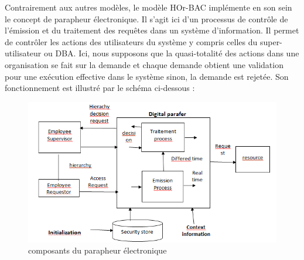 \label{sectionArchitectureBOr-BAC}

Contrairement aux autres modèles, le modèle HOr-BAC implémente en son sein le concept de parapheur électronique. Il s'agit ici d'un processus de contrôle de l'émission et du traitement des requêtes dans un système d'information. Il permet de contrôler les actions des utilisateurs du système y compris celles du  super-utilisateur ou DBA. Ici, nous supposons que la quasi-totalité des actions dans une organisation se fait sur la demande et chaque demande obtient une validation pour une exécution effective dans le système sinon, la demande est rejetée. Son fonctionnement est illustré par le schéma ci-dessous :

\begin{figure}[h!]
    \centering
		\includegraphics[scale=0.7]{chap2/images/hor-bac.png}
    \caption{composants du parapheur électronique}
	 \label{figHor-bac}
\end{figure} 

